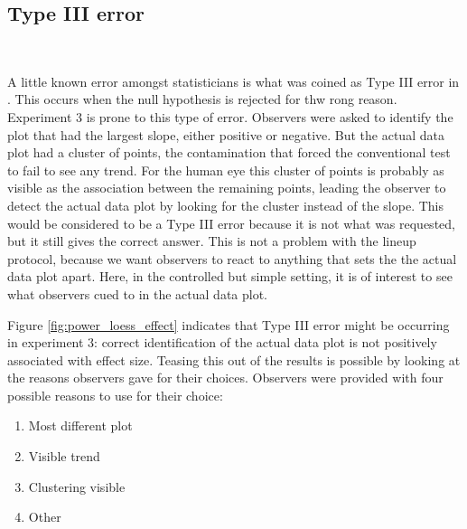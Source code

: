 \documentclass[12pt]{article}
\begin{document}
\subsection{Type III error}~\label{sec:TypeIII}


A little known error amongst statisticians is what was coined as Type III error in \citet{mosteller:48}. This occurs when the null hypothesis is rejected for thw rong reason. Experiment 3 is prone to this type of error. Observers were asked to identify the plot that had the largest slope, either positive or negative. But the actual data plot had a cluster of points, the contamination that forced the conventional test to fail to see any trend. For the human eye this cluster of points is probably as visible as the association between the remaining points, leading the observer to detect the actual data plot by looking for the cluster instead of the slope. This would be considered to be a Type III error because it is not what was requested, but it still gives the correct answer. This is not a problem with the lineup protocol, because we want observers to react to anything that sets the the actual data plot apart. Here, in the controlled but simple setting, it is of interest to see what observers cued to in the actual data plot. 

Figure \ref{fig:power_loess_effect} indicates that Type III error might be occurring in experiment 3: correct identification of the actual data plot is not positively associated with effect size. Teasing this out of the results is possible by looking at the reasons observers gave for their choices. Observers were provided with four possible reasons to use for their choice:


\begin{enumerate} \itemsep 0in
\item Most different plot
\item Visible trend
\item Clustering visible
\item Other
\end{enumerate}
\end{document}
